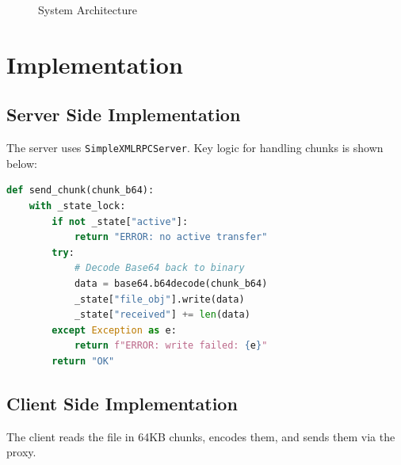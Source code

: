 \documentclass[a4paper,12pt]{article}
\begin{document}
\begin{figure}[h]
    \centering
    \caption{System Architecture}
\end{figure}

\section{Implementation}

\subsection{Server Side Implementation}
The server uses \texttt{SimpleXMLRPCServer}. Key logic for handling chunks is shown below:

\begin{lstlisting}[language=Python, caption=Server Logic for Receiving Chunks]
def send_chunk(chunk_b64):
    with _state_lock:
        if not _state["active"]:
            return "ERROR: no active transfer"
        try:
            # Decode Base64 back to binary
            data = base64.b64decode(chunk_b64)
            _state["file_obj"].write(data)
            _state["received"] += len(data)
        except Exception as e:
            return f"ERROR: write failed: {e}"
        return "OK"
\end{lstlisting}

\subsection{Client Side Implementation}
The client reads the file in 64KB chunks, encodes them, and sends them via the proxy.
\end{document}
